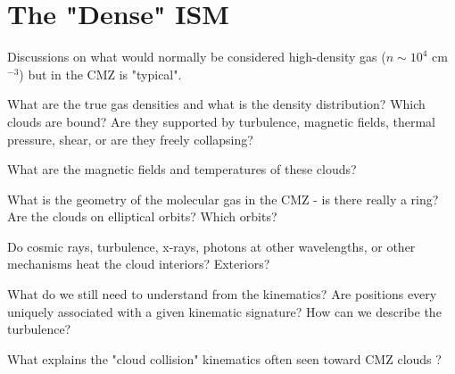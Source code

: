 \section{The "Dense" ISM}
Discussions on what would normally be considered high-density gas ($n\sim10^4$ cm$^{-3}$) but in the CMZ is "typical".

What are the true gas densities and what is the density distribution?  Which clouds are bound?  Are they supported by turbulence, magnetic fields, thermal pressure, shear, or are they freely collapsing?

What are the magnetic fields and temperatures of these clouds?

What is the geometry of the molecular gas in the CMZ - is there really a ring?  Are the clouds on elliptical orbits?  Which orbits?

Do cosmic rays, turbulence, x-rays, photons at other wavelengths, or other mechanisms heat the cloud interiors?  Exteriors?

What do we still need to understand from the kinematics?  Are positions every uniquely associated with a given kinematic signature?  How can we describe the turbulence?

What explains the "cloud collision" kinematics often seen toward CMZ clouds \citep{Tanaka2015a,Tanaka2014a,Oka2012a}?